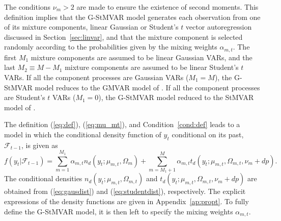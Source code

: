\documentclass[nojss]{jss}
\begin{document}
The conditions $\nu_m>2$ are made to ensure the existence of second moments.  This definition implies that the G-StMVAR model generates each observation from one of its mixture components, linear Gaussian or Student's $t$ vector autoregression discussed in Section~\ref{sec:linvar}, and that the mixture component is selected randomly according to the probabilities given by the mixing weights $\alpha_{m,t}$. The first $M_1$ mixture components are assumed to be linear Gaussian VARs,  and the last $M_2\equiv M - M_1$ mixture components are assumed to be linear Student's $t$ VARs.  If all the component processes are Gaussian VARs ($M_1=M$),  the G-StMVAR model reduces to the GMVAR model of \cite{Kalliovirta+Meitz+Saikkonen:2016}.  If all the component processes are Student's $t$ VARs ($M_1=0$), the G-StMVAR model reduced to the StMVAR model of \cite{Virolainen2:2021}.

The definition (\ref{eq:def}),  (\ref{eq:mu_mt}), and Condition~\ref{cond:def} leads to a model in which the conditional density function of $y_t$ conditional on its past, $\mathcal{F}_{t-1}$,  is given as
\begin{equation}\label{eq:conddist}
f(y_t|\mathcal{F}_{t-1}) = \sum_{m=1}^{M_1}\alpha_{m,t}n_d(y_t;\mu_{m,t},\Omega_{m}) +  \sum_{m=M_1+1}^M\alpha_{m,t}t_d(y_t;\mu_{m,t},\Omega_{m,t},\nu_m+dp).
\end{equation}
The conditional densities $n_d(y_t;\mu_{m,t},\Omega_{m,t})$ and $t_d(y_t;\mu_{m,t},\Omega_{m,t},\nu_m+dp)$ are obtained from (\ref{eq:gausdist}) and (\ref{eq:studentdist}), respectively. The explicit expressions of the density functions are given in Appendix~\ref{ap:propt}. To fully define the G-StMVAR model, it is then left to specify the mixing weights $\alpha_{m,t}$.
\end{document}
